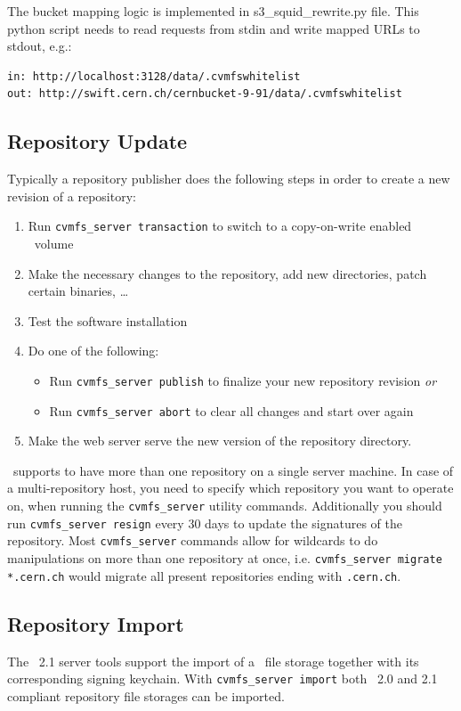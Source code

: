 The bucket mapping logic is implemented in s3\_squid\_rewrite.py file. This python script needs to read requests from stdin and write mapped URLs to stdout, e.g.:
\begin{verbatim}
in: http://localhost:3128/data/.cvmfswhitelist
out: http://swift.cern.ch/cernbucket-9-91/data/.cvmfswhitelist
\end{verbatim}

\subsection{Repository Update}
\label{sct:repoupdateprocedure}
Typically a repository publisher does the following steps in order to create a new revision of a repository:
\begin{enumerate}
	\item Run \texttt{cvmfs\_server transaction} to switch to a copy-on-write enabled \cvmfs\ volume
	\item Make the necessary changes to the repository, \eg add new directories, patch certain binaries, \dots
	\item Test the software installation
	\item Do one of the following:
	\begin{itemize}
		\item Run \texttt{cvmfs\_server publish} to finalize your new repository revision \emph{or}
		\item Run \texttt{cvmfs\_server abort} to clear all changes and start over again
	\end{itemize}
	\item Make the web server serve the new version of the repository directory.
\end{enumerate}

\cvmfs\ supports to have more than one repository on a single server machine.
In case of a multi-repository host, you need to specify which repository you want to operate on, when running the \texttt{cvmfs\_server} utility commands.
Additionally you should run \texttt{cvmfs\_server resign} every 30 days to update the signatures of the repository.
Most \texttt{cvmfs\_server} commands allow for wildcards to do manipulations on more than one repository at once, i.e. \texttt{cvmfs\_server migrate *.cern.ch} would migrate all present repositories ending with \texttt{.cern.ch}.

\subsection{Repository Import}
The \cvmfs\ 2.1 server tools support the import of a \cvmfs\ file storage together with its corresponding signing keychain.
With \texttt{cvmfs\_server import} both \cvmfs\ 2.0 and 2.1 compliant repository file storages can be imported.


